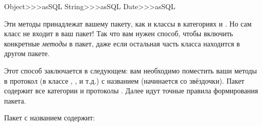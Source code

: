 \documentclass[a4paper,10pt,twoside]{book}
\begin{document}
\begin{code}{}
Object>>>asSQL
String>>>asSQL
Date>>>asSQL
\end{code}

\noindent

Эти методы принадлежат вашему пакету, как и классы в категориях  и . Но сам класс  не входит в ваш пакет! Так что вам нужен способ, чтобы включить конкретные \emph{методы} в пакет, даже если остальная часть класса находится в другом пакете.


Этот способ заключается в следующем: вам необходимо поместить ваши методы в протокол (в классе , ,  и т.д.) с названием  (начинается со звёздочки). Пакет  содержит все категории  и протоколы . Далее идут точные правила формирования пакета.

Пакет с названием  содержит:

\end{document}
